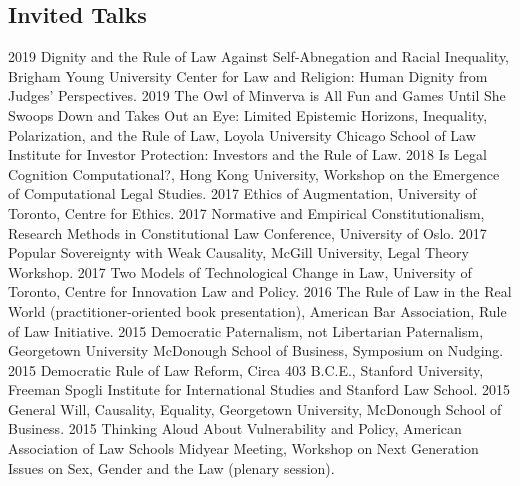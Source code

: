 \documentclass[letterpaper]{moderncv}
\begin{document}
\subsection{Invited Talks}
\cvitem
{2019}
{Dignity and the Rule of Law Against Self-Abnegation and Racial Inequality, Brigham Young University Center for Law and Religion: Human Dignity from Judges' Perspectives.}
\vspace{1mm}
\cvitem
{2019}
{The Owl of Minverva is All Fun and Games Until She Swoops Down and Takes Out an Eye: Limited Epistemic Horizons, Inequality, Polarization, and the Rule of Law, Loyola University Chicago School of Law Institute for Investor Protection: Investors and the Rule of Law.}
\vspace{1mm}
\cvitem
{2018}
{Is Legal Cognition Computational?, Hong Kong University, Workshop on the Emergence of Computational Legal Studies.}
\vspace{1mm}
\cvitem
{2017}
{Ethics of Augmentation, University of Toronto, Centre for Ethics.}
\vspace{1mm}
\cvitem
{2017}
{Normative and Empirical Constitutionalism, Research Methods in Constitutional Law Conference, University of Oslo.}
\vspace{1mm}
\cvitem
{2017}
{Popular Sovereignty with Weak Causality, McGill University, Legal Theory Workshop.}
\vspace{1mm}
\cvitem
{2017}
{Two Models of Technological Change in Law, University of Toronto, Centre for Innovation Law and Policy.}
\vspace{1mm}
\cvitem
{2016}
{The Rule of Law in the Real World (practitioner-oriented book presentation), American Bar Association, Rule of Law Initiative.}
\vspace{1mm}
\cvitem
{2015}
{Democratic Paternalism, not Libertarian Paternalism, Georgetown University McDonough School of Business, Symposium on Nudging.}
\vspace{1mm}
\cvitem
{2015}
{Democratic Rule of Law Reform, Circa 403 B.C.E., Stanford University, Freeman Spogli Institute for International Studies and Stanford Law School.}
\vspace{1mm}
\cvitem
{2015}
{General Will, Causality, Equality, Georgetown University, McDonough School of Business.}
\vspace{1mm}
\cvitem
{2015}
{Thinking Aloud About Vulnerability and Policy, American Association of Law Schools Midyear Meeting, Workshop on Next Generation Issues on Sex, Gender and the Law (plenary session).}
\vspace{1mm}
\end{document}
